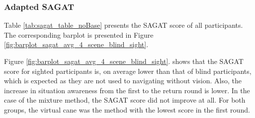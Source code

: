 \subsubsection{Adapted SAGAT}
\label{subsubsec:results_adapted_sagat_2}

Table \ref{tab:sagat_table_noBase} presents the SAGAT score of all participants. The corresponding barplot is presented in Figure \ref{fig:barplot_sagat_avg_4_scene_blind_sight}.



Figure \ref{fig:barplot_sagat_avg_4_scene_blind_sight}. shows that the SAGAT score for sighted participants is, on average lower than that of blind participants, which is expected as they are not used to navigating without vision. Also, the increase in situation awareness from the first to the return round is lower. In the case of the mixture method, the SAGAT score did not improve at all. For both groups, the virtual cane was the method with the lowest score in the first round.

